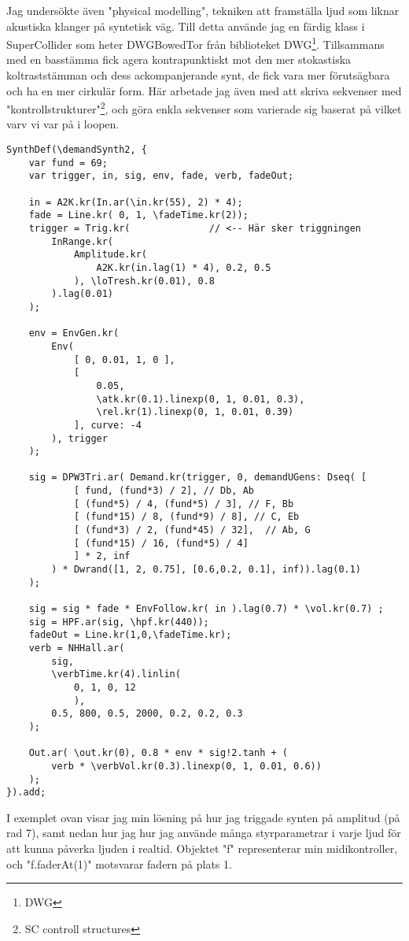 \documentclass{article}
\begin{document}

	Jag undersökte även "physical modelling", tekniken att framställa ljud som liknar akustiska klanger på
	syntetisk väg. Till detta använde jag en färdig klass i SuperCollider som heter DWGBowedTor från
	biblioteket DWG\footnote{DWG}. Tillsammans med en basstämma fick agera kontrapunktiskt mot den mer
	stokastiska koltraststämman och dess ackompanjerande synt, de fick vara mer förutsägbara och ha en mer
	cirkulär form. Här arbetade jag även med att skriva sekvenser med "kontrollstrukturer"\footnote{SC
	controll structures}, och göra enkla sekvenser som varierade sig baserat på vilket varv vi var på i
	loopen. 
	\pagebreak

\begin{lstlisting}[style=SuperCollider-IDE, caption=Amplitudtriggad synt]
SynthDef(\demandSynth2, {
	var fund = 69;
	var trigger, in, sig, env, fade, verb, fadeOut;

	in = A2K.kr(In.ar(\in.kr(55), 2) * 4);
	fade = Line.kr( 0, 1, \fadeTime.kr(2));
	trigger = Trig.kr(			    // <-- Här sker triggningen
		InRange.kr( 
			Amplitude.kr(
				A2K.kr(in.lag(1) * 4), 0.2, 0.5
			), \loTresh.kr(0.01), 0.8 
		).lag(0.01)
	);

	env = EnvGen.kr(
		Env( 
			[ 0, 0.01, 1, 0 ],
			[
				0.05,
				\atk.kr(0.1).linexp(0, 1, 0.01, 0.3),
				\rel.kr(1).linexp(0, 1, 0.01, 0.39) 
			], curve: -4
		), trigger
	);

	sig = DPW3Tri.ar( Demand.kr(trigger, 0, demandUGens: Dseq( [ 
			[ fund, (fund*3) / 2], // Db, Ab
			[ (fund*5) / 4, (fund*5) / 3], // F, Bb
			[ (fund*15) / 8, (fund*9) / 8], // C, Eb
			[ (fund*3) / 2, (fund*45) / 32],  // Ab, G
			[ (fund*15) / 16, (fund*5) / 4]
			] * 2, inf
		) * Dwrand([1, 2, 0.75], [0.6,0.2, 0.1], inf)).lag(0.1)
	);

	sig = sig * fade * EnvFollow.kr( in ).lag(0.7) * \vol.kr(0.7) ;
	sig = HPF.ar(sig, \hpf.kr(440));
	fadeOut = Line.kr(1,0,\fadeTime.kr);
	verb = NHHall.ar(
		sig, 
		\verbTime.kr(4).linlin(
			0, 1, 0, 12
			), 
		0.5, 800, 0.5, 2000, 0.2, 0.2, 0.3
	);

	Out.ar( \out.kr(0), 0.8 * env * sig!2.tanh + ( 
		verb * \verbVol.kr(0.3).linexp(0, 1, 0.01, 0.6))
	);  
}).add;
\end{lstlisting}


  I exemplet ovan visar jag min lösning på hur jag triggade synten på amplitud (på rad 7), samt nedan hur jag
  hur jag använde många styrparametrar i varje ljud för att kunna påverka ljuden i realtid. Objektet "f"
  representerar min midikontroller, och "f.faderAt(1)" motsvarar fadern på plats 1.
\end{document}
